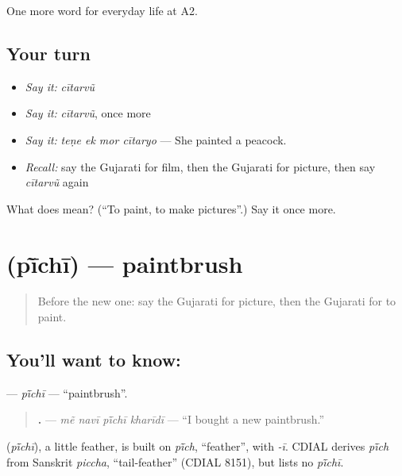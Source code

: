 \begin{grammarlens}[title={What you've built}]
One more word for everyday life at A2.
\end{grammarlens}

\subsection*{Your turn}
\begin{itemize}
\raggedright
  \item \emph{Say it:} \emph{cītarvũ}
  \item \emph{Say it:} \emph{cītarvũ}, once more
  \item \emph{Say it:} \emph{teṇe ek mor cītaryo} — She painted a peacock.
  \item \emph{Recall:} say the Gujarati for film, then the Gujarati for picture, then say \emph{cītarvũ} again
\end{itemize}

\begin{tcolorbox}[breakable,colback=teal!4,colframe=teal!35!black,title={Before you move on}]
What does  mean? (\textquotedblleft{}To paint, to make pictures\textquotedblright{}.) Say it once more.
\end{tcolorbox}
\section[\texorpdfstring{\gu{પીંછી} (pī̃chī)}{પીંછી (pī̃chī)}]{ (pī̃chī) — paintbrush}

\label{lesson:GU-C256-pichi}



\begin{quote}
Before the new one: say the Gujarati for picture, then the Gujarati for to paint.
\end{quote}

\subsection*{You'll want to know: }
\textbf{} — \emph{pī̃chī} — \textquotedblleft{}paintbrush\textquotedblright{}.

\begin{quote}
\textbf{   .} — \emph{mẽ navī pī̃chī kharīdī} — \textquotedblleft{}I bought a new paintbrush.\textquotedblright{}
\end{quote}

\begin{cousinweb}
\textbf{} (\emph{pī̃chī}), a little feather, is built on \emph{pī̃ch}, \textquotedblleft{}feather\textquotedblright{}, with \emph{-ī}. CDIAL derives \emph{pī̃ch} from Sanskrit \emph{piccha}, \textquotedblleft{}tail-feather\textquotedblright{} (CDIAL 8151), but lists no \emph{pī̃chī}.
\end{cousinweb}

